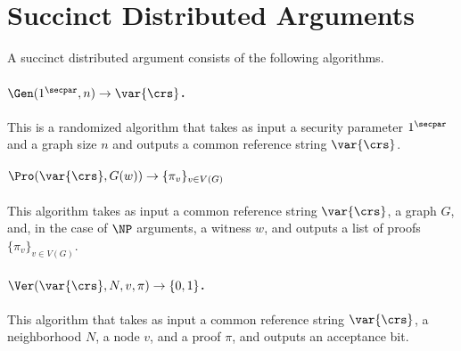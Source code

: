 \section{Succinct Distributed Arguments}
A succinct distributed argument consists of the following algorithms.

\paragraph{$\Gen(1^\secpar, n)\to \var{\crs}$.} This is a randomized algorithm that takes as input a security parameter $1^\secpar$ and a graph size $n$ and outputs a common reference string $\var{\crs}$.

\paragraph{$\Pro(\var{\crs}, G (w))\to \{\pi_v\}_{v\in V(G)}$}
This algorithm takes as input a common reference string $\var{\crs}$, %
a graph $G$, and, in the case of $\NP$ arguments, a witness $w$, and outputs a list of proofs $\{\pi_v\}_{v\in V(G)}$.

\paragraph{$\Ver(\var{\crs}, N, v, \pi)\to \{0,1\}$.} This algorithm that takes as input a common reference string $\var{\crs}$, a neighborhood $N$, a node $v$, and a proof $\pi$, and outputs an acceptance bit.



